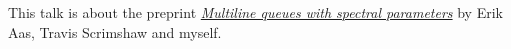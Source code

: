 \documentclass[reqno]{amsart}
\newcommand{\0}{\phantom{c}}
\newcommand{\SymGp}[1]{\mathfrak{S}_{#1}} %
\theoremstyle{plain}
\theoremstyle{definition}
\numberwithin{equation}{section}
\begin{document}











This talk is about the preprint
\href{http://www.cip.ifi.lmu.de/~grinberg/algebra/mlqs.pdf}{\textit{Multiline queues with spectral parameters}}
by Erik Aas, Travis Scrimshaw and myself.
\end{document}
